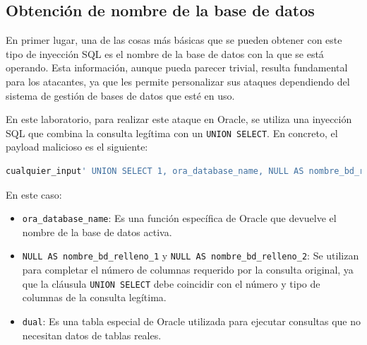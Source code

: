 \documentclass[a4paper,12pt]{article}
\begin{document}
\subsection{Obtención de nombre de la base de datos}
En primer lugar, una de las cosas más básicas que se pueden obtener con este tipo de inyección SQL es el nombre de la base de datos con la que se está operando. Esta información, aunque pueda parecer trivial, resulta fundamental para los atacantes, ya que les permite personalizar sus ataques dependiendo del sistema de gestión de bases de datos que esté en uso.

En este laboratorio, para realizar este ataque en Oracle, se utiliza una inyección SQL que combina la consulta legítima con un \texttt{UNION SELECT}. En concreto, el payload malicioso es el siguiente:

\begin{lstlisting}[language=SQL]
cualquier_input' UNION SELECT 1, ora_database_name, NULL AS nombre_bd_relleno_1, NULL AS nombre_bd_relleno_2 FROM dual --
\end{lstlisting}

En este caso:
\begin{itemize}
    \item \texttt{ora\_database\_name}: Es una función específica de Oracle que devuelve el nombre de la base de datos activa.
    \item \texttt{NULL AS nombre\_bd\_relleno\_1} y \texttt{NULL AS nombre\_bd\_relleno\_2}: Se utilizan para completar el número de columnas requerido por la consulta original, ya que la cláusula \texttt{UNION SELECT} debe coincidir con el número y tipo de columnas de la consulta legítima.
    \item \texttt{dual}: Es una tabla especial de Oracle utilizada para ejecutar consultas que no necesitan datos de tablas reales.
\end{itemize}
\end{document}
